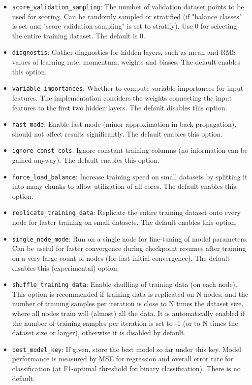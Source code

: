 \documentclass[12pt]{article}
\begin{document}
\begin{itemize}
\item \texttt{score\_validation\_sampling}: The number of validation dataset points to be used for scoring. Can be randomly sampled or stratified (if "balance classes" is set and "score validation sampling" is set to stratify). Use 0 for selecting the entire training dataset. The default is 0.
\item \texttt{diagnostis}: Gather diagnostics for hidden layers, such as mean and RMS values of learning rate, momentum, weights and biases. The default enables this option.
\item \texttt{variable\_importances}: Whether to compute variable importances for input features. The implementation considers the weights connecting the input features to the first two hidden layers. The default disables this option.
\item \texttt{fast\_mode}: Enable fast mode (minor approximation in back-propagation), should not affect results significantly. The default enables this option.
\item \texttt{ignore\_const\_cols}: Ignore constant training columns (no information can be gained anyway). The default enables this option.
\item \texttt{force\_load\_balance}:  Increase training speed on small datasets by splitting it into many chunks to allow utilization of all cores. The default enables this option.
\item \texttt{replicate\_training\_data}:  Replicate the entire training dataset onto every node for faster training on small datasets. The default enables this option.
\item \texttt{single\_node\_mode}:  Run on a single node for fine-tuning of model parameters. Can be useful for faster convergence during checkpoint resumes after training on a very large count of nodes (for fast initial convergence). The default disables this (experimental) option.
\item \texttt{shuffle\_training\_data}: Enable shuffling of training data (on each node). This option is recommended if training data is replicated on N nodes, and the number of training samples per iteration is close to N times the dataset size, where all nodes train will (almost) all the data. It is automatically enabled if the number of training samples per iteration is set to -1 (or to N times the dataset size or larger), otherwise it is disabled by default.
\item \texttt{best\_model\_key}: If given, store the best model so far under this key. Model performance is measured by MSE for regression and overall error rate for classification (at F1-optimal threshold for binary classification). There is no default.
\end{itemize}
\end{document}

